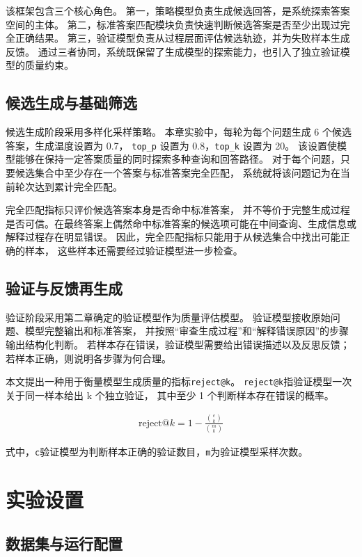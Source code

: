 该框架包含三个核心角色。
第一，策略模型负责生成候选回答，是系统探索答案空间的主体。
第二，标准答案匹配模块负责快速判断候选答案是否至少出现过完全正确结果。
第三，验证模型负责从过程层面评估候选轨迹，并为失败样本生成反馈。
通过三者协同，系统既保留了生成模型的探索能力，也引入了独立验证模型的质量约束。

\subsection{候选生成与基础筛选}

候选生成阶段采用多样化采样策略。
本章实验中，每轮为每个问题生成 6 个候选答案，生成温度设置为 0.7，
\texttt{top\_p} 设置为 0.8，\texttt{top\_k} 设置为 20。
该设置使模型能够在保持一定答案质量的同时探索多种查询和回答路径。
对于每个问题，只要候选集合中至少存在一个答案与标准答案完全匹配，
系统就将该问题记为在当前轮次达到累计完全匹配。

完全匹配指标只评价候选答案本身是否命中标准答案，
并不等价于完整生成过程是否可信。在最终答案上偶然命中标准答案的候选项可能在中间查询、生成信息或解释过程存在明显错误。
因此，完全匹配指标只能用于从候选集合中找出可能正确的样本，
这些样本还需要经过验证模型进一步检查。

\subsection{验证与反馈再生成}

验证阶段采用第二章确定的验证模型作为质量评估模型。
验证模型接收原始问题、模型完整输出和标准答案，
并按照“审查生成过程”和“解释错误原因”的步骤输出结构化判断。
若样本存在错误，验证模型需要给出错误描述以及反思反馈；
若样本正确，则说明各步骤为何合理。

本文提出一种用于衡量模型生成质量的指标\texttt{reject@k}。
\texttt{reject@k}指验证模型一次关于同一样本给出 k 个独立验证，
其中至少 1 个判断样本存在错误的概率。

\begin{align}
\mathrm{reject@}k
= 1 - \frac{\binom{\mathrm{c}}{k}}{\binom{m}{k}}
\end{align}

式中，\texttt{c}验证模型为判断样本正确的验证数目，\texttt{m}为验证模型采样次数。


\section{实验设置}

\subsection{数据集与运行配置}

